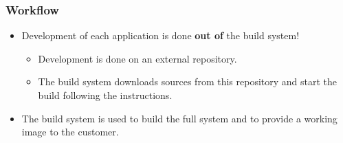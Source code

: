 \begin{frame}
  \frametitle{Workflow}
  \begin{itemize}
    \item Development of each application is done
          \textbf{out of} the build system!
      \begin{itemize}
        \item Development is done on an external repository.
        \item The build system downloads sources from this repository
              and start the build following the instructions.
      \end{itemize}
    \item The build system is used to build the full system and 
          to provide a working image to the customer.
  \end{itemize}
\end{frame}
